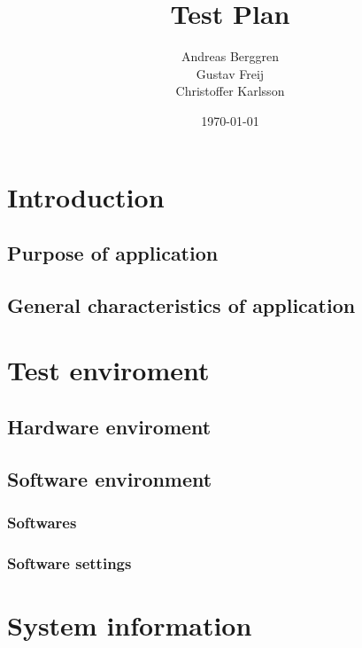 \documentclass[a4paper,titlepage]{article}
\title{Test Plan}
\author{Andreas Berggren\\
        Gustav Freij\\
        Christoffer Karlsson}
\date{\today}
\begin{document}
\maketitle

\tableofcontents
\newpage

% 
\setcounter{page}{1}


\section{Introduction}
\subsection{Purpose of application}
\subsection{General characteristics of application}

\section{Test enviroment}

\subsection{Hardware enviroment}

\subsection{Software environment}

\subsubsection{Softwares}
\subsubsection{Software settings}


\section{System information}
\end{document}
